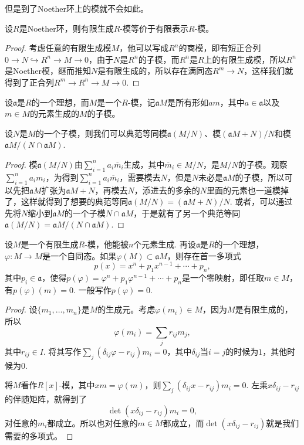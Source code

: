 但是到了Noether环上的模就不会如此。

\begin{pro}
	设$R$是Noether环，则有限生成$R$-模等价于有限表示$R$-模。
\end{pro}

\begin{proof}
	考虑任意的有限生成模$M$，他可以写成$R^n$的商模，即有短正合列$0\to N \hookrightarrow R^n \to M\to 0$，由于$N$是$R^n$的子模，而$R^n$是$R$上的有限生成模，所以$R^n$是Noether模，继而推知$N$是有限生成的，所以存在满同态$R^m\to N$，这样我们就得到了正合列$R^m\to R^n\to M\to 0$.
\end{proof}

\para 设$\mathfrak{a}$是$R$的一个理想，而$M$是一个$R$-模，记$\mathfrak{a}M$是所有形如$am$，其中$a\in \mathfrak{a}$以及$m\in M$的元素生成的$M$的子模。\endpara

\begin{lem}
	设$N$是$M$的一个子模，则我们可以典范等同模$\mathfrak{a}(M/N)$、模$(\mathfrak{a}M+N)/N$和模$\mathfrak{a}M/(N\cap \mathfrak{a}M)$.
\end{lem}

\begin{proof}
	模$\mathfrak{a}(M/N)$由$\sum_{i=1}^n a_i\overline{m}_i$生成，其中$\overline{m}_i\in M/N$，是$M/N$的子模。观察$\sum_{i=1}^n a_i m_i$，为得到$\sum_{i=1}^n a_i\overline{m}_i$，需要模去$N$，但是$N$未必是$\mathfrak{a}M$的子模，所以可以先把$\mathfrak{a}M$扩张为$\mathfrak{a}M+N$，再模去$N$，添进去的多余的$N$里面的元素也一道模掉了，这样就得到了想要的典范等同$\mathfrak{a}(M/N)=(\mathfrak{a}M+N)/N$. 或者，可以通过先将$N$缩小到$\mathfrak{a}M$的一个子模$N\cap \mathfrak{a}M$，于是就有了另一个典范等同$\mathfrak{a}(M/N)=\mathfrak{a}M/(N\cap \mathfrak{a}M)$.
\end{proof}

\begin{thm}\label{Hamilton-Cayley}
设$M$是一个有限生成$R$-模，他能被$n$个元素生成. 再设$\mathfrak{a}$是$R$的一个理想，$\varphi:M\to M$是一个自同态。如果$\varphi(M)\subset \mathfrak{a}M$，则存在首一多项式
\[
	p(x)=x^n+p_1x^{n-1}+\cdots+p_n,
\]
其中$p_i\in \mathfrak{a}$，使得$p(\varphi)=\varphi^n+p_1\varphi^{n-1}+\cdots+p_n$是一个零映射，即任取$m\in M$，有$p(\varphi)(m)=0$. 一般写作$p(\varphi)=0$.
\end{thm}

\begin{proof}
	设$\{m_1,\dots,m_n\}$是$M$的生成元。考虑$\varphi(m_i)\in M$，因为$M$是有限生成的，所以
	\[
	\varphi(m_i)=\sum_{j}r_{ij}m_j,
	\]
	其中$r_{ij}\in I$. 将其写作$\sum_{j}(\delta_{ij}\varphi-r_{ij})m_i=0$，其中$\delta_{ij}$当$i=j$的时候为$1$，其他时候为$0$.

	将$M$看作$R[x]$-模，其中$xm=\varphi(m)$，则$\sum_{j}(\delta_{ij}x-r_{ij})m_i=0$. 左乘$x\delta_{ij}-r_{ij}$的伴随矩阵，就得到了
	\[
	\det\left(x\delta_{ij}-r_{ij}\right)m_i=0,
	\]
	对任意的$m_i$都成立。所以也对任意的$m\in M$都成立，而$\det\left(x\delta_{ij}-r_{ij}\right)$就是我们需要的多项式。
\end{proof}

